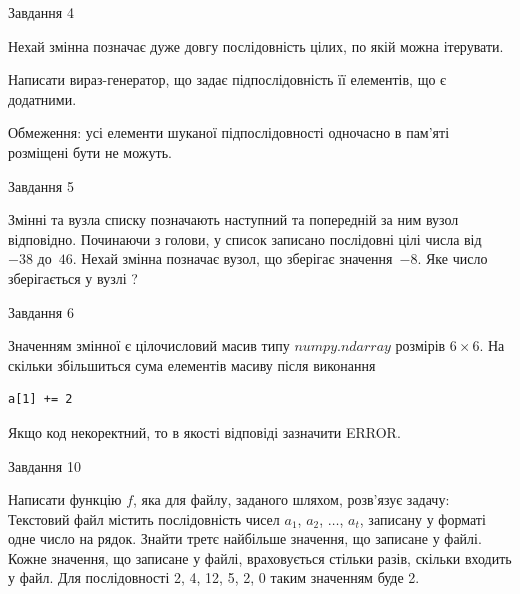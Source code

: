 \documentclass[12pt, ukrainian]{article}
\begin{document}
{               
{\begin{center}Завдання {4}\end{center}}
\vspace{-6mm}
Нехай змінна  позначає дуже довгу послідовність цілих, по якій можна ітерувати.

Написати вираз-генератор, що задає підпослідовність її елементів, що є додатни\-ми.

Обмеження: усі елементи шуканої підпослідовності одночасно в пам'яті розміщені бути не можуть.\par

\vspace{10mm}
               
{\begin{center}Завдання {5}\end{center}}
\vspace{-6mm}
Змінні  та  вузла списку позначають наступний та попередній за ним вузол відповідно. Починаючи з голови, у список записано послідовні цілі числа від~$-38$ до~$46$. Нехай змінна  позначає вузол, що зберігає значення~$-8$.
Яке число зберігається у вузлі  ?\par

               
{\begin{center}Завдання {6}\end{center}}
\vspace{-6mm}
Значенням змінної  є цілочисловий масив типу $numpy.ndarray$ розмірів $6{\times}6$. На скільки збільшиться сума елементів масиву  після виконання
\begin{verbatim}
a[1] += 2
\end{verbatim}


Якщо код некоректний, то в якості відповіді зазначити ERROR.\par

               
{\begin{center}Завдання {10}\end{center}}
\vspace{-6mm}

Написати функцію $f$, яка для файлу, заданого шляхом, розв’язує задачу:\\ Текстовий файл містить послідовність чисел $a_1$, $a_2$, $\ldots$, $a_t$, записану у форматі одне число на рядок. Знайти третє найбільше значення, що записане у файлі. Кожне значення, що записане у файлі, враховується стільки разів, скільки входить у файл. Для послідовності 2, 4, 12, 5, 2, 0 таким значенням буде 2.

}
\end{document}
